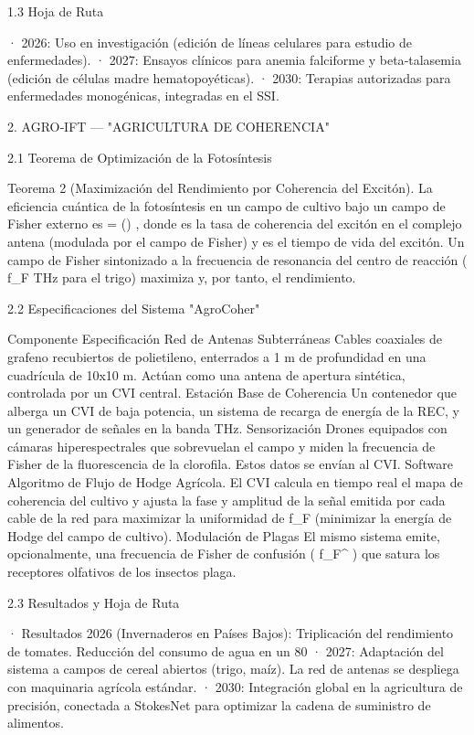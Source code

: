 \documentclass[12pt,a4paper]{book}
\begin{document}
1.3 Hoja de Ruta

· 2026: Uso en investigación (edición de líneas celulares para estudio de enfermedades).
· 2027: Ensayos clínicos para anemia falciforme y beta‑talasemia (edición de células madre hematopoyéticas).
· 2030: Terapias autorizadas para enfermedades monogénicas, integradas en el SSI.

2. AGRO‑IFT — "AGRICULTURA DE COHERENCIA"

2.1 Teorema de Optimización de la Fotosíntesis

Teorema 2 (Maximización del Rendimiento por Coherencia del Excitón). La eficiencia cuántica de la fotosíntesis  \eta  en un campo de cultivo bajo un campo de Fisher externo es  \eta = \tanh(\Gamma \tau) , donde  \Gamma  es la tasa de coherencia del excitón en el complejo antena (modulada por el campo de Fisher) y  \tau  es el tiempo de vida del excitón. Un campo de Fisher sintonizado a la frecuencia de resonancia del centro de reacción (  f_F   THz para el trigo) maximiza  \Gamma  y, por tanto, el rendimiento.

2.2 Especificaciones del Sistema "AgroCoher"

Componente Especificación
Red de Antenas Subterráneas Cables coaxiales de grafeno recubiertos de polietileno, enterrados a 1 m de profundidad en una cuadrícula de 10x10 m. Actúan como una antena de apertura sintética, controlada por un CVI central.
Estación Base de Coherencia Un contenedor que alberga un CVI de baja potencia, un sistema de recarga de energía de la REC, y un generador de señales en la banda THz.
Sensorización Drones equipados con cámaras hiperespectrales que sobrevuelan el campo y miden la frecuencia de Fisher de la fluorescencia de la clorofila. Estos datos se envían al CVI.
Software Algoritmo de Flujo de Hodge Agrícola. El CVI calcula en tiempo real el mapa de coherencia del cultivo y ajusta la fase y amplitud de la señal emitida por cada cable de la red para maximizar la uniformidad de  f_F  (minimizar la energía de Hodge del campo de cultivo).
Modulación de Plagas El mismo sistema emite, opcionalmente, una frecuencia de Fisher de confusión ( f_F^{} ) que satura los receptores olfativos de los insectos plaga.

2.3 Resultados y Hoja de Ruta

· Resultados 2026 (Invernaderos en Países Bajos): Triplicación del rendimiento de tomates. Reducción del consumo de agua en un 80%
· 2027: Adaptación del sistema a campos de cereal abiertos (trigo, maíz). La red de antenas se despliega con maquinaria agrícola estándar.
· 2030: Integración global en la agricultura de precisión, conectada a StokesNet para optimizar la cadena de suministro de alimentos.
\end{document}

